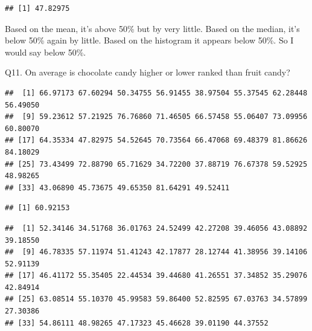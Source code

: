 \documentclass[
]{article}
\newenvironment{Shaded}{\begin{snugshade}}{\end{snugshade}}
\newcommand{\FunctionTok}[1]{\textcolor[rgb]{0.13,0.29,0.53}{\textbf{#1}}}
\newcommand{\NormalTok}[1]{#1}
\newcommand{\SpecialCharTok}[1]{\textcolor[rgb]{0.81,0.36,0.00}{\textbf{#1}}}
\begin{document}
\begin{verbatim}
## [1] 47.82975
\end{verbatim}

Based on the mean, it's above 50\% but by very little. Based on the
median, it's below 50\% again by little. Based on the histogram it
appears below 50\%. So I would say below 50\%.

Q11. On average is chocolate candy higher or lower ranked than fruit
candy?

\begin{Shaded}
\end{Shaded}

\begin{verbatim}
##  [1] 66.97173 67.60294 50.34755 56.91455 38.97504 55.37545 62.28448 56.49050
##  [9] 59.23612 57.21925 76.76860 71.46505 66.57458 55.06407 73.09956 60.80070
## [17] 64.35334 47.82975 54.52645 70.73564 66.47068 69.48379 81.86626 84.18029
## [25] 73.43499 72.88790 65.71629 34.72200 37.88719 76.67378 59.52925 48.98265
## [33] 43.06890 45.73675 49.65350 81.64291 49.52411
\end{verbatim}

\begin{Shaded}
\end{Shaded}

\begin{verbatim}
## [1] 60.92153
\end{verbatim}

\begin{Shaded}
\end{Shaded}

\begin{verbatim}
##  [1] 52.34146 34.51768 36.01763 24.52499 42.27208 39.46056 43.08892 39.18550
##  [9] 46.78335 57.11974 51.41243 42.17877 28.12744 41.38956 39.14106 52.91139
## [17] 46.41172 55.35405 22.44534 39.44680 41.26551 37.34852 35.29076 42.84914
## [25] 63.08514 55.10370 45.99583 59.86400 52.82595 67.03763 34.57899 27.30386
## [33] 54.86111 48.98265 47.17323 45.46628 39.01190 44.37552
\end{verbatim}
\end{document}
